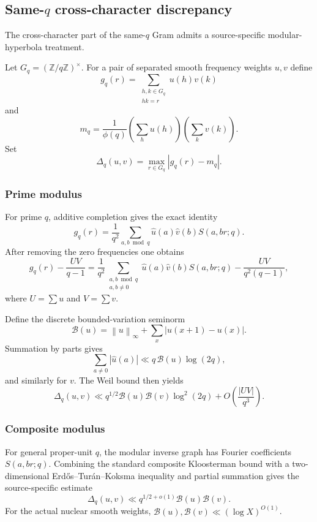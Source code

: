 \documentclass[11pt]{article}
\theoremstyle{definition}
\newcommand{\1}{\mathbf 1}
\newcommand{\Z}{\mathbb Z}
\newcommand{\norm}[1]{\left\lVert #1\right\rVert}
\begin{document}
\subsection{Same-\texorpdfstring{$q$}{q} cross-character discrepancy}

The cross-character part of the same-$q$ Gram admits a source-specific
modular-hyperbola treatment.

Let $G_q=(\Z/q\Z)^\times$.  For a pair of separated smooth frequency
weights $u,v$ define
\[
  g_q(r)
  =
  \sum_{\substack{h,k\in G_q\\hk=r}}u(h)v(k)
\]
and
\[
  m_q
  =
  \frac1{\phi(q)}
  \left(\sum_hu(h)\right)
  \left(\sum_kv(k)\right).
\]
Set
\[
   \Delta_q(u,v)=\max_{r\in G_q}|g_q(r)-m_q|.
\]

\subsubsection{Prime modulus}

For prime $q$, additive completion gives the exact identity
\[
 g_q(r)
 =
 \frac1{q^2}
 \sum_{a,b\bmod q}
   \widehat u(a)\widehat v(b)S(a,br;q).
\]
After removing the zero frequencies one obtains
\[
 g_q(r)-\frac{UV}{q-1}
 =
 \frac1{q^2}
 \sum_{\substack{a,b\bmod q\\a,b\ne0}}
   \widehat u(a)\widehat v(b)S(a,br;q)
 -
 \frac{UV}{q^2(q-1)},
\]
where $U=\sum u$ and $V=\sum v$.

Define the discrete bounded-variation seminorm
\[
  \mathcal B(u)
  =
  \norm{u}_\infty+\sum_x|u(x+1)-u(x)|.
\]
Summation by parts gives
\[
 \sum_{a\ne0}|\widehat u(a)|
 \ll
 q\,\mathcal B(u)\log(2q),
\]
and similarly for $v$.  The Weil bound then yields
\begin{equation}
 \Delta_q(u,v)
 \ll
 q^{1/2}\mathcal B(u)\mathcal B(v)\log^2(2q)
 +
 O\!\left(\frac{|UV|}{q^3}\right).
 \label{eq:prime-discrepancy}
\end{equation}

\subsubsection{Composite modulus}

For general proper-unit $q$, the modular inverse graph has Fourier
coefficients $S(a,br;q)$.  Combining the standard composite Kloosterman
bound with a two-dimensional Erd\H{o}s--Tur\'an--Koksma inequality and
partial summation gives the source-specific estimate
\begin{equation}
   \boxed{
   \Delta_q(u,v)
   \ll
   q^{1/2+o(1)}
   \mathcal B(u)\mathcal B(v).
   }
   \label{eq:composite-discrepancy}
\end{equation}
For the actual nuclear smooth weights,
$\mathcal B(u),\mathcal B(v)\ll(\log X)^{O(1)}$.
\end{document}

